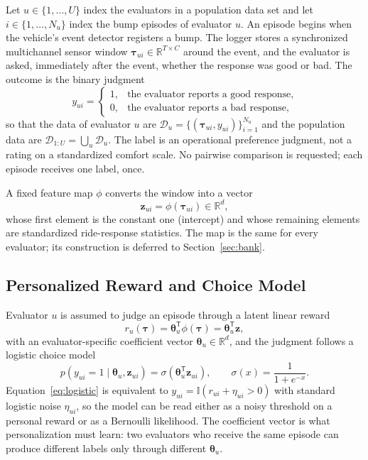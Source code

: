 \documentclass[lettersize,journal]{IEEEtran}
\newcommand{\R}{\mathbb{R}}
\newcommand{\sigmoid}{\sigma}
\newcommand{\T}{\mathsf{T}}
\newcommand{\D}{\mathcal{D}}
\begin{document}
Let $u\in\{1,\ldots,U\}$ index the evaluators in a population data set and let $i\in\{1,\ldots,N_u\}$ index the bump episodes of evaluator $u$. An episode begins when the vehicle's event detector registers a bump. The logger stores a synchronized multichannel sensor window $\bm\tau_{ui}\in\R^{T\times C}$ around the event, and the evaluator is asked, immediately after the event, whether the response was good or bad. The outcome is the binary judgment
\begin{equation}
 y_{ui}=\begin{cases}
 1, & \text{the evaluator reports a good response},\\
 0, & \text{the evaluator reports a bad response},
 \end{cases}
\end{equation}
so that the data of evaluator $u$ are $\D_u=\{(\bm\tau_{ui},y_{ui})\}_{i=1}^{N_u}$ and the population data are $\D_{1:U}=\bigcup_u\D_u$. The label is an operational preference judgment, not a rating on a standardized comfort scale. No pairwise comparison is requested; each episode receives one label, once.

A fixed feature map $\phi$ converts the window into a vector
\begin{equation}
 \bm z_{ui}=\phi(\bm\tau_{ui})\in\R^{d},
 \label{eq:feature-map}
\end{equation}
whose first element is the constant one (intercept) and whose remaining elements are standardized ride-response statistics. The map is the same for every evaluator; its construction is deferred to Section~\ref{sec:bank}.

\subsection{Personalized Reward and Choice Model}

Evaluator $u$ is assumed to judge an episode through a latent linear reward
\begin{equation}
 r_u(\bm\tau)=\bm\theta_u^{\T}\phi(\bm\tau)=\bm\theta_u^{\T}\bm z,
 \label{eq:reward}
\end{equation}
with an evaluator-specific coefficient vector $\bm\theta_u\in\R^d$, and the judgment follows a logistic choice model
\begin{equation}
 p(y_{ui}=1\mid\bm\theta_u,\bm z_{ui})=\sigmoid(\bm\theta_u^{\T}\bm z_{ui}),
 \qquad
 \sigmoid(x)=\frac{1}{1+e^{-x}}.
 \label{eq:logistic}
\end{equation}
Equation~\eqref{eq:logistic} is equivalent to $y_{ui}=\mathbb{I}(r_{ui}+\eta_{ui}>0)$ with standard logistic noise $\eta_{ui}$, so the model can be read either as a noisy threshold on a personal reward or as a Bernoulli likelihood. The coefficient vector is what personalization must learn: two evaluators who receive the same episode can produce different labels only through different $\bm\theta_u$.
\end{document}
